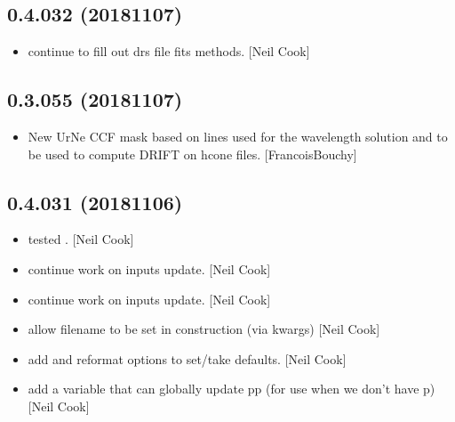 \documentclass[a4paper,10pt,english]{report}
\begin{document}
\subsection{0.4.032 (2018\sphinxhyphen{}11\sphinxhyphen{}07)}
\label{\detokenize{misc/changelog:id285}}\begin{itemize}
\item {} 
 \sphinxhyphen{} continue to fill out drs file fits methods. {[}Neil
Cook{]}

\end{itemize}


\subsection{0.3.055 (2018\sphinxhyphen{}11\sphinxhyphen{}07)}
\label{\detokenize{misc/changelog:id286}}\begin{itemize}
\item {} 
New UrNe CCF mask based on lines used for the wavelength solution and
to be used to compute DRIFT on hcone files. {[}FrancoisBouchy{]}

\end{itemize}


\subsection{0.4.031 (2018\sphinxhyphen{}11\sphinxhyphen{}06)}
\label{\detokenize{misc/changelog:id287}}\begin{itemize}
\item {} 
 \sphinxhyphen{} tested . {[}Neil Cook{]}

\item {} 
 \sphinxhyphen{} continue work on inputs update. {[}Neil Cook{]}

\item {} 
 \sphinxhyphen{} continue work on inputs update. {[}Neil Cook{]}

\item {} 
 \sphinxhyphen{} allow filename to be set in construction (via kwargs)
{[}Neil Cook{]}

\item {} 
 \sphinxhyphen{} add and reformat options to set/take defaults.
{[}Neil Cook{]}

\item {} 
 \sphinxhyphen{} add a variable that can globally update pp (for use
when we don’t have p) {[}Neil Cook{]}

\end{itemize}
\end{document}
